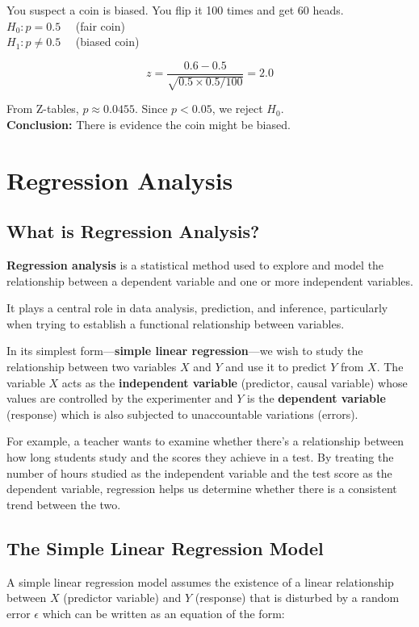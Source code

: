 \documentclass[twoside]{book}
\begin{document}
You suspect a coin is biased. You flip it 100 times and get 60 heads. \\
\( H_0: p = 0.5 \quad \) (fair coin) \\
\( H_1: p \neq 0.5 \quad \) (biased coin)

\[
z = \frac{0.6 - 0.5}{\sqrt{0.5 \times 0.5 / 100}} = 2.0
\]

From Z-tables, \( p \approx 0.0455 \). Since \( p < 0.05 \), we reject \( H_0 \). \\
\textbf{Conclusion:} There is evidence the coin might be biased.
\chapter{Regression Analysis}

\section{What is Regression Analysis?}

\begin{textbox}
    \textbf{Regression analysis} is a statistical method used to explore and model the relationship between a dependent variable and one or more independent variables.
\end{textbox}
 It plays a central role in data analysis, prediction, and inference, particularly when trying to establish a functional relationship between variables.

In its simplest form—\textbf{simple linear regression}—we wish to study the relationship between two variables $X$ and $Y$ and use it to predict $Y$ from $X$. The variable $X$ acts as the \textbf{independent variable} (predictor, causal variable) whose values are controlled by the experimenter and $Y$ is the \textbf{dependent variable} (response) which is also subjected to unaccountable variations (errors).

For example, a teacher wants to examine whether there's a relationship between how long students study and the scores they achieve in a test. By treating the number of hours studied as the independent variable and the test score as the dependent variable, regression helps us determine whether there is a consistent trend between the two.

\section{The Simple Linear Regression Model}

A simple linear regression model assumes the existence of a linear relationship between $X$ (predictor variable) and $Y$ (response) that is disturbed by a random error $\epsilon$ which can be written as an equation of the form:
\end{document}
